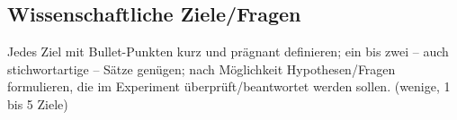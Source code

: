 \documentclass[a4paper,11pt,DIV=calc,tablecaptionabove,headinclude,twoside]{article}
\begin{document}
%	
%
%

\subsection{Wissenschaftliche Ziele/Fragen}
Jedes Ziel mit Bullet-Punkten kurz und prägnant definieren; ein bis zwei -- auch stichwortartige -- Sätze genügen; nach Möglichkeit Hypothesen/Fragen formulieren, die im Experiment überprüft/beantwortet werden sollen. (wenige, 1 bis 5 Ziele)
\end{document}
